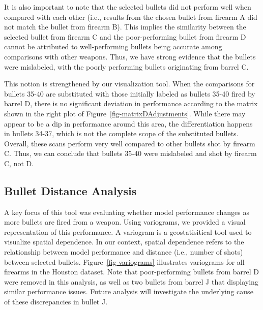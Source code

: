 \documentclass[
  12pt]{article}
\begin{document}
It is also important to note that the selected bullets did not perform
well when compared with each other (i.e., results from the chosen bullet
from firearm A did not match the bullet from firearm B). This implies
the similarity between the selected bullet from firearm C and the
poor-performing bullet from firearm D cannot be attributed to
well-performing bullets being accurate among comparisons with other
weapons. Thus, we have strong evidence that the bullets were mislabeled,
with the poorly performing bullets originating from barrel C.

This notion is strengthened by our visualization tool. When the
comparisons for bullets 35-40 are substituted with those initially
labeled as bullets 35-40 fired by barrel D, there is no significant
deviation in performance according to the matrix shown in the right plot
of Figure~\ref{fig-matrixDAdjustments}. While there may appear to be a
dip in performance around this area, the differentiation happens in
bullets 34-37, which is not the complete scope of the substituted
bullets. Overall, these scans perform very well compared to other
bullets shot by firearm C. Thus, we can conclude that bullets 35-40 were
mislabeled and shot by firearm C, not D.

\subsection{Bullet Distance Analysis}\label{bullet-distance-analysis}

A key focus of this tool was evaluating whether model performance
changes as more bullets are fired from a weapon. Using variograms, we
provided a visual representation of this performance. A variogram is a
geostatisitical tool used to visualize spatial dependence. In our
context, spatial dependence refers to the relationship between model
performance and distance (i.e., number of shots) between selected
bullets. Figure~\ref{fig-variograms} illustrates variograms for all
firearms in the Houston dataset. Note that poor-performing bullets from
barrel D were removed in this analysis, as well as two bullets from
barrel J that displaying similar performance issues. Future analysis
will investigate the underlying cause of these discrepancies in bullet
J.
\end{document}
